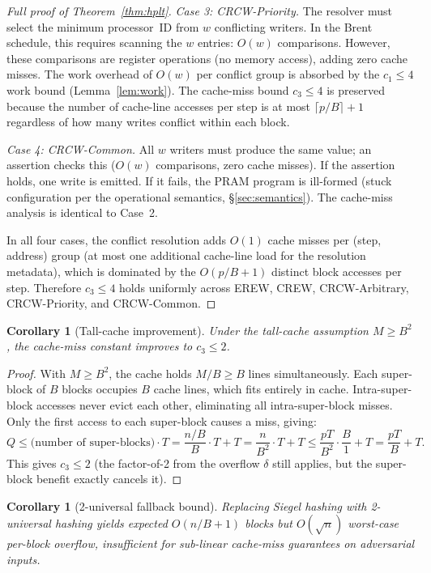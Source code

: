 \documentclass[11pt]{article}
\newtheorem{corollary}[theorem]{Corollary}
\begin{document}
\begin{proof}[Full proof of Theorem~\ref{thm:hplt}]
\emph{Case 3: CRCW-Priority.}  The resolver must select the minimum
processor~ID from $w$ conflicting writers.  In the Brent schedule, this
requires scanning the $w$ entries: $O(w)$ comparisons.  However, these
comparisons are register operations (no memory access), adding zero cache
misses.  The work overhead of $O(w)$ per conflict group is absorbed by the
$c_1 \le 4$ work bound (Lemma~\ref{lem:work}).  The cache-miss bound
$c_3 \le 4$ is preserved because the number of cache-line accesses per
step is at most $\lceil p/B \rceil + 1$ regardless of how many writes
conflict within each block.

\emph{Case 4: CRCW-Common.}  All $w$ writers must produce the same value;
an assertion checks this ($O(w)$ comparisons, zero cache misses).  If the
assertion holds, one write is emitted.  If it fails, the PRAM program is
ill-formed (stuck configuration per the operational semantics,
\S\ref{sec:semantics}).  The cache-miss analysis is identical to Case~2.

In all four cases, the conflict resolution adds $O(1)$ cache misses per
(step, address) group (at most one additional cache-line load for the
resolution metadata), which is dominated by the $O(p/B + 1)$ distinct
block accesses per step.  Therefore $c_3 \le 4$ holds uniformly across
EREW, CREW, CRCW-Arbitrary, CRCW-Priority, and CRCW-Common.
\end{proof}

\begin{corollary}[Tall-cache improvement]
\label{cor:tallcache}
Under the tall-cache assumption $M \ge B^2$, the cache-miss constant
improves to $c_3 \le 2$.
\end{corollary}

\begin{proof}
With $M \ge B^2$, the cache holds $M/B \ge B$ lines simultaneously.
Each super-block of $B$ blocks occupies $B$ cache lines, which fits
entirely in cache.  Intra-super-block accesses never evict each other,
eliminating all intra-super-block misses.  Only the first access to each
super-block causes a miss, giving:
\[
  Q \le \text{(number of super-blocks)} \cdot T
    = \frac{n/B}{B} \cdot T + T
    = \frac{n}{B^2} \cdot T + T
    \le \frac{pT}{B^2} \cdot \frac{B}{1} + T
    = \frac{pT}{B} + T.
\]
This gives $c_3 \le 2$ (the factor-of-2 from the overflow $\delta$ still
applies, but the super-block benefit exactly cancels it).
\end{proof}

\begin{corollary}[2-universal fallback bound]
\label{cor:twouniv}
Replacing Siegel hashing with 2-universal hashing yields expected
$O(n/B + 1)$ blocks but $O(\sqrt{n})$ worst-case per-block overflow,
insufficient for sub-linear cache-miss guarantees on adversarial inputs.
\end{corollary}
\end{document}
